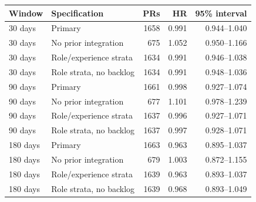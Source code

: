 \begin{tabular}{llrrr}
\toprule
Window & Specification & PRs & HR & 95\% interval \\
\midrule
30 days & Primary & 1658 & 0.991 & 0.944--1.040 \\
30 days & No prior integration & 675 & 1.052 & 0.950--1.166 \\
30 days & Role/experience strata & 1634 & 0.991 & 0.946--1.038 \\
30 days & Role strata, no backlog & 1634 & 0.991 & 0.948--1.036 \\
90 days & Primary & 1661 & 0.998 & 0.927--1.074 \\
90 days & No prior integration & 677 & 1.101 & 0.978--1.239 \\
90 days & Role/experience strata & 1637 & 0.996 & 0.927--1.071 \\
90 days & Role strata, no backlog & 1637 & 0.997 & 0.928--1.071 \\
180 days & Primary & 1663 & 0.963 & 0.895--1.037 \\
180 days & No prior integration & 679 & 1.003 & 0.872--1.155 \\
180 days & Role/experience strata & 1639 & 0.963 & 0.893--1.037 \\
180 days & Role strata, no backlog & 1639 & 0.968 & 0.893--1.049 \\
\bottomrule
\end{tabular}
